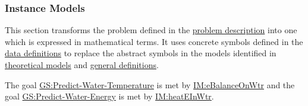 \documentclass[12pt]{article}
\begin{document}
\subsubsection{Instance Models}
\label{Sec:IMs}
This section transforms the problem defined in the \hyperref[Sec:ProbDesc]{problem description} into one which is expressed in mathematical terms. It uses concrete symbols defined in the \hyperref[Sec:DDs]{data definitions} to replace the abstract symbols in the models identified in \hyperref[Sec:TMs]{theoretical models} and \hyperref[Sec:GDs]{general definitions}.

The goal \hyperref[waterTempGS]{GS:Predict-Water-Temperature} is met by \hyperref[IM:eBalanceOnWtr]{IM:eBalanceOnWtr} and the goal \hyperref[waterEnergyGS]{GS:Predict-Water-Energy} is met by \hyperref[IM:heatEInWtr]{IM:heatEInWtr}.
\end{document}

